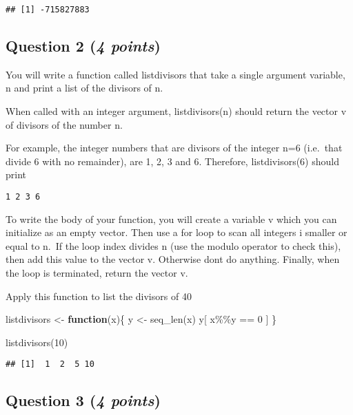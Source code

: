 \documentclass[
]{article}
\newenvironment{Shaded}{\begin{snugshade}}{\end{snugshade}}
\newcommand{\ControlFlowTok}[1]{\textcolor[rgb]{0.13,0.29,0.53}{\textbf{#1}}}
\newcommand{\DecValTok}[1]{\textcolor[rgb]{0.00,0.00,0.81}{#1}}
\newcommand{\FunctionTok}[1]{\textcolor[rgb]{0.00,0.00,0.00}{#1}}
\newcommand{\NormalTok}[1]{#1}
\newcommand{\OtherTok}[1]{\textcolor[rgb]{0.56,0.35,0.01}{#1}}
\newcommand{\SpecialCharTok}[1]{\textcolor[rgb]{0.00,0.00,0.00}{#1}}
\begin{document}
\begin{verbatim}
## [1] -715827883
\end{verbatim}

\hypertarget{question-2-4-points}{%
\subsection{\texorpdfstring{Question 2 (\emph{4
points})}{Question 2 (4 points)}}\label{question-2-4-points}}

You will write a function called listdivisors that take a single
argument variable, n and print a list of the divisors of n.

When called with an integer argument, listdivisors(n) should return the
vector v of divisors of the number n.~

For example, the integer numbers that are divisors of the integer n=6
(i.e.~that divide 6 with no remainder), are 1, 2, 3 and 6. Therefore,
listdivisors(6) should print

\begin{verbatim}
1 2 3 6
\end{verbatim}

To write the body of your function, you will create a variable v which
you can initialize as an empty vector. Then use a for loop to scan all
integers i smaller or equal to n.~If the loop index divides n (use the
modulo operator to check this), then add this value to the vector v.
Otherwise dont do anything. Finally, when the loop is terminated, return
the vector v.

Apply this function to list the divisors of 40

\begin{Shaded}
\begin{Highlighting}[]
\NormalTok{listdivisors }\OtherTok{\textless{}{-}} \ControlFlowTok{function}\NormalTok{(x)\{}
\NormalTok{  y }\OtherTok{\textless{}{-}} \FunctionTok{seq\_len}\NormalTok{(x)}
\NormalTok{  y[ x}\SpecialCharTok{\%\%}\NormalTok{y }\SpecialCharTok{==} \DecValTok{0}\NormalTok{ ]}
\NormalTok{\}}


\FunctionTok{listdivisors}\NormalTok{(}\DecValTok{10}\NormalTok{)}
\end{Highlighting}
\end{Shaded}

\begin{verbatim}
## [1]  1  2  5 10
\end{verbatim}

\hypertarget{question-3-4-points}{%
\subsection{\texorpdfstring{Question 3 (\emph{4
points})}{Question 3 (4 points)}}\label{question-3-4-points}}
\end{document}
